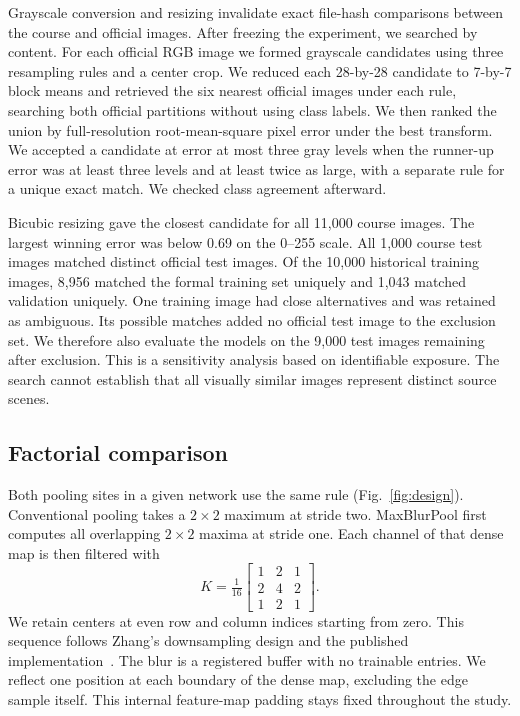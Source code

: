 \documentclass[conference]{IEEEtran}
\begin{document}
Grayscale conversion and resizing invalidate exact file-hash comparisons between the course and official images. After freezing the experiment, we searched by content. For each official RGB image we formed grayscale candidates using three resampling rules and a center crop. We reduced each 28-by-28 candidate to 7-by-7 block means and retrieved the six nearest official images under each rule, searching both official partitions without using class labels. We then ranked the union by full-resolution root-mean-square pixel error under the best transform. We accepted a candidate at error at most three gray levels when the runner-up error was at least three levels and at least twice as large, with a separate rule for a unique exact match. We checked class agreement afterward.

Bicubic resizing gave the closest candidate for all 11,000 course images. The largest winning error was below 0.69 on the 0--255 scale. All 1,000 course test images matched distinct official test images. Of the 10,000 historical training images, 8,956 matched the formal training set uniquely and 1,043 matched validation uniquely. One training image had close alternatives and was retained as ambiguous. Its possible matches added no official test image to the exclusion set. We therefore also evaluate the models on the 9,000 test images remaining after exclusion. This is a sensitivity analysis based on identifiable exposure. The search cannot establish that all visually similar images represent distinct source scenes.

\subsection{Factorial comparison}
Both pooling sites in a given network use the same rule (Fig.~\ref{fig:design}). Conventional pooling takes a $2\times2$ maximum at stride two. MaxBlurPool first computes all overlapping $2\times2$ maxima at stride one. Each channel of that dense map is then filtered with
\[
 K=\tfrac{1}{16}
 \begin{bmatrix}1&2&1\\2&4&2\\1&2&1\end{bmatrix}.
\]
We retain centers at even row and column indices starting from zero. This sequence follows Zhang's downsampling design and the published implementation~\cite{zhang2019,adobe}. The blur is a registered buffer with no trainable entries. We reflect one position at each boundary of the dense map, excluding the edge sample itself. This internal feature-map padding stays fixed throughout the study.
\end{document}
